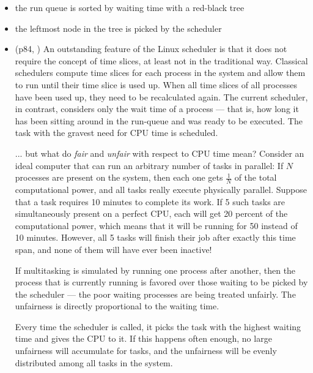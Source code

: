 \begin{frame}
  \begin{center}
     
  \end{center}
  \begin{itemize}
  \item the run queue is sorted by waiting time with a red-black tree
  \item the leftmost node in the tree is picked by the scheduler
  \end{itemize}
\end{frame}

\begin{itemize}
\item (p84, \cite{mauerer2008professional}) An outstanding feature of the Linux scheduler
  is that it does not require the concept of time slices, at least not in the traditional
  way. Classical schedulers compute time slices for each process in the system and allow
  them to run until their time slice is used up. When all time slices of all processes
  have been used up, they need to be recalculated again. The current scheduler, in
  contrast, considers only the wait time of a process --- that is, how long it has been
  sitting around in the run-queue and was ready to be executed. The task with the gravest
  need for CPU time is scheduled.

  ... but what do \emph{fair} and \emph{unfair} with respect to CPU time mean? Consider an
  ideal computer that can run an arbitrary number of tasks in parallel: If $N$ processes
  are present on the system, then each one gets $\frac{1}{N}$ of the total computational
  power, and all tasks really execute physically parallel. Suppose that a task requires 10
  minutes to complete its work. If 5 such tasks are simultaneously present on a perfect
  CPU, each will get 20 percent of the computational power, which means that it will be
  running for 50 instead of 10 minutes. However, all 5 tasks will finish their job after
  exactly this time span, and none of them will have ever been inactive!

  If multitasking is simulated by running one process after another, then the process that
  is currently running is favored over those waiting to be picked by the scheduler --- the
  poor waiting processes are being treated unfairly. The unfairness is directly
  proportional to the waiting time.

  Every time the scheduler is called, it picks the task with the highest waiting time and
  gives the CPU to it. If this happens often enough, no large unfairness will accumulate
  for tasks, and the unfairness will be evenly distributed among all tasks in the system.
\end{itemize}


